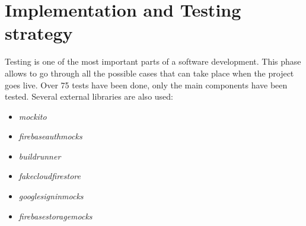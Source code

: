 \chapter{Implementation and Testing strategy}
Testing is one of the most important parts of a software development.
This phase allows to go through all the possible cases that can take place when the project goes live.
Over 75 tests have been done, only the main components have been tested.
Several external libraries are also used:
\begin{itemize}
    \item \textit{mockito}
    \item \textit{firebase\textunderscore auth\textunderscore mocks}
    \item \textit{build\textunderscore runner}
    \item \textit{fake\textunderscore cloud\textunderscore firestore}
    \item \textit{google\textunderscore sign\textunderscore in\textunderscore mocks}
    \item \textit{firebase\textunderscore storage\textunderscore mocks}
\end{itemize}








